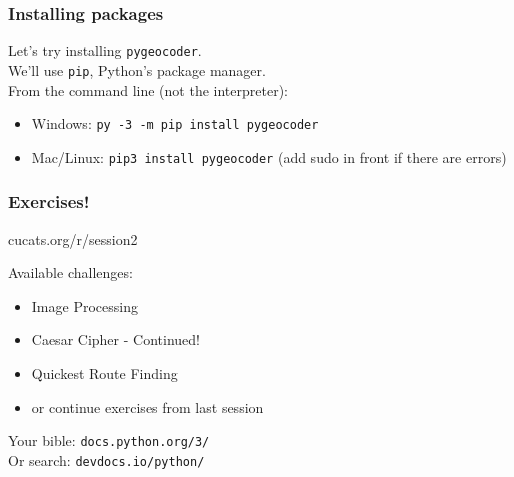 \documentclass[notes]{beamer}
\begin{document}
	\begin{frame}[fragile]
		\frametitle{Installing packages}
		Let's try installing \colorbox{codebg}{\lstinline|pygeocoder|}.\\
		\vspace{10pt}
		We'll use \colorbox{codebg}{\lstinline|pip|}, Python's package manager.\\
		\vspace{10pt}
		From the command line (not the interpreter):
		\begin{itemize}
			\item Windows: \colorbox{codebg}{\lstinline|py -3 -m pip install pygeocoder|}
			\item Mac/Linux: \colorbox{codebg}{\lstinline|pip3 install pygeocoder|} (add sudo in front if there are errors)
		\end{itemize}
	\end{frame}

	\begin{frame}[fragile]
		\frametitle{Exercises!}
		\vfill
		\centerline{\LARGE cucats.org/r/session2}
		\vfill
		Available challenges:
		\begin{itemize}
			\item Image Processing
			\item Caesar Cipher - Continued!
			\item Quickest Route Finding
			\item or continue exercises from last session
		\end{itemize}
		\vspace{10pt}
		Your bible: \lstinline|docs.python.org/3/|\\
		Or search: \lstinline|devdocs.io/python/|
	\end{frame}
\end{document}
